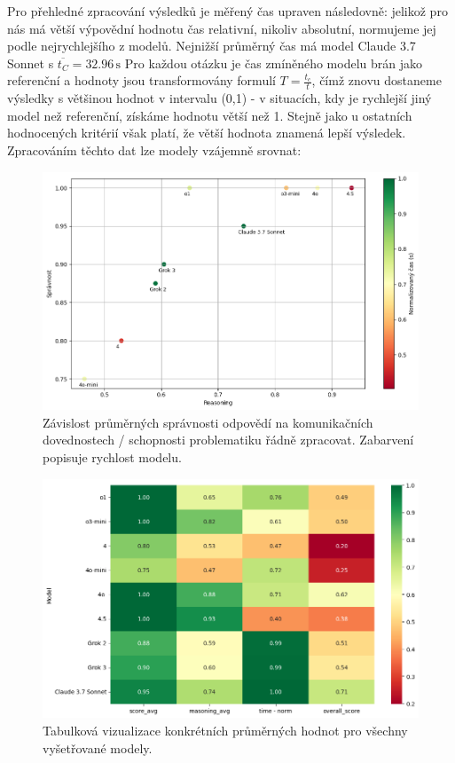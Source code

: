\documentclass[czech,11pt,a4paper]{article}
\begin{document}
		\begin{multicols}{2}
		Pro přehledné zpracování výsledků je měřený čas upraven následovně: jelikož pro nás má větší výpovědní hodnotu čas relativní, nikoliv absolutní, normujeme jej podle nejrychlejšího z modelů. Nejnižší průměrný čas má model Claude 3.7 Sonnet s $\overline{t_C} = 32.96\,\mathrm{s}$ Pro každou otázku je čas zmíněného modelu brán jako referenční a hodnoty jsou transformovány formulí $T = \frac{{t_c}}{t}$, čímž znovu dostaneme výsledky s většinou hodnot v intervalu (0,1) - v situacích, kdy je rychlejší jiný model než referenční, získáme hodnotu větší než 1. Stejně jako u ostatních hodnocených kritérií však platí, že větší hodnota znamená lepší výsledek. Zpracováním těchto dat lze modely vzájemně srovnat:
		\begin{figure}[H]
			\centering
			\includegraphics[width=0.8\linewidth]{plot1}
			\caption{Závislost průměrných správnosti odpovědí na komunikačních dovednostech / schopnosti problematiku řádně zpracovat. Zabarvení popisuje rychlost modelu.}
			\label{fig:plot1}
		\end{figure}
		\begin{figure}[H]
			\centering
			\includegraphics[width=0.8\linewidth]{plot2}
			\caption{Tabulková vizualizace konkrétních průměrných hodnot pro všechny vyšetřované modely.}

\end{figure}
\end{multicols}
\end{document}
